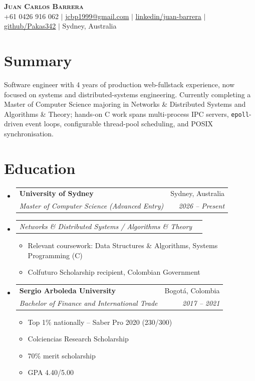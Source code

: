 \documentclass[letterpaper,10pt]{article}
\makeatletter
\newcommand{\resumeItem}[1]{
  \item\small{
    {#1 \vspace{-2pt}}
  }
}
\newcommand{\resumeSubheading}[4]{
  \vspace{-2pt}\item
    \begin{tabular*}{0.97\textwidth}[t]{l@{\extracolsep{\fill}}r}
      \textbf{#1} & #2 \\
      \textit{\small#3} & \textit{\small #4} \\
    \end{tabular*}\vspace{-7pt}
}
\newcommand{\resumeSubSubheading}[2]{
    \item
    \begin{tabular*}{0.97\textwidth}{l@{\extracolsep{\fill}}r}
      \textit{\small#1} & \textit{\small #2} \\
    \end{tabular*}\vspace{-7pt}
}
\newcommand{\resumeSubHeadingListStart}{\begin{itemize}[leftmargin=0.15in, label={}]}
\newcommand{\resumeSubHeadingListEnd}{\end{itemize}}
\newcommand{\resumeItemListStart}{\begin{itemize}}
\newcommand{\resumeItemListEnd}{\end{itemize}\vspace{-5pt}}
\makeatother
\begin{document}
\begin{center}
    \textbf{\Huge \scshape Juan Carlos Barrera} \\ \vspace{1pt}
    \small +61 0426 916 062 $|$
    \href{mailto:jcbp1999@gmail.com}{\underline{jcbp1999@gmail.com}} $|$
    \href{https://linkedin.com/in/juan-carlos-barrera-pinilla-16b13419b}{\underline{linkedin/juan-barrera}} $|$
    \href{https://github.com/Pakas342}{\underline{github/Pakas342}} $|$
    Sydney, Australia
\end{center}

\section{Summary}
\small{Software engineer with 4 years of production web-fullstack experience, now focused on systems and distributed-systems engineering. Currently completing a Master of Computer Science majoring in Networks \& Distributed Systems and Algorithms \& Theory; hands-on C work spans multi-process IPC servers, \texttt{epoll}-driven event loops, configurable thread-pool scheduling, and POSIX synchronisation.}

\section{Education}
  \resumeSubHeadingListStart

\resumeSubheading
  {University of Sydney}{Sydney, Australia}
  {Master of Computer Science (Advanced Entry)}{2026 -- Present}
\vspace{-2pt}\resumeSubSubheading
  {Networks \& Distributed Systems / Algorithms \& Theory}{}
      \resumeItemListStart
        \resumeItem{Relevant coursework: Data Structures \& Algorithms, Systems Programming (C)}
        \resumeItem{Colfuturo Scholarship recipient, Colombian Government}
      \resumeItemListEnd

    \resumeSubheading
      {Sergio Arboleda University}{Bogot\'a, Colombia}
      {Bachelor of Finance and International Trade}{2017 -- 2021}
      \resumeItemListStart
      \resumeItem{Top 1\% nationally -- Saber Pro 2020 (230/300)}
        \resumeItem{Colciencias Research Scholarship}
        \resumeItem{70\% merit scholarship}
        \resumeItem{GPA 4.40/5.00}
      \resumeItemListEnd

  \resumeSubHeadingListEnd
\end{document}
